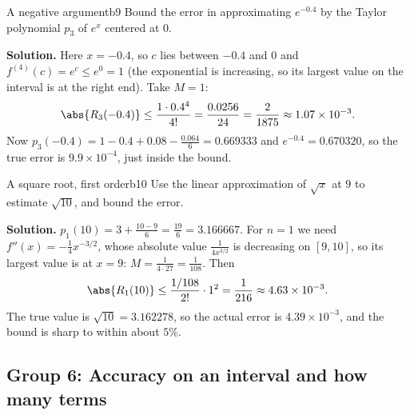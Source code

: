 \documentclass[11pt]{article}
\begin{document}
\begin{exmp}{A negative argument}{b9}
Bound the error in approximating $e^{-0.4}$ by the Taylor polynomial $p_3$ of $e^x$ centered at $0$.

\textbf{Solution.} Here $x=-0.4$, so $c$ lies between $-0.4$ and $0$ and $f^{(4)}(c)=e^c\le e^0=1$ (the exponential is increasing, so its largest value on the interval is at the right end). Take $M=1$:
\[
\abs{R_3(-0.4)}\le\frac{1\cdot0.4^4}{4!}=\frac{0.0256}{24}=\frac2{1875}\approx1.07\times10^{-3}.
\]
Now $p_3(-0.4)=1-0.4+0.08-\frac{0.064}6=0.669333$ and $e^{-0.4}=0.670320$, so the true error is $9.9\times10^{-4}$, just inside the bound.
\end{exmp}

\begin{exmp}{A square root, first order}{b10}
Use the linear approximation of $\sqrt x$ at $9$ to estimate $\sqrt{10}$, and bound the error.

\textbf{Solution.} $p_1(10)=3+\frac{10-9}6=\frac{19}6=3.166667$. For $n=1$ we need $f''(x)=-\frac14x^{-3/2}$, whose absolute value $\frac1{4x^{3/2}}$ is decreasing on $[9,10]$, so its largest value is at $x=9$: $M=\frac1{4\cdot27}=\frac1{108}$. Then
\[
\abs{R_1(10)}\le\frac{1/108}{2!}\cdot1^2=\frac1{216}\approx4.63\times10^{-3}.
\]
The true value is $\sqrt{10}=3.162278$, so the actual error is $4.39\times10^{-3}$, and the bound is sharp to within about $5\%$.
\end{exmp}

\subsection*{Group 6: Accuracy on an interval and how many terms}
\end{document}
